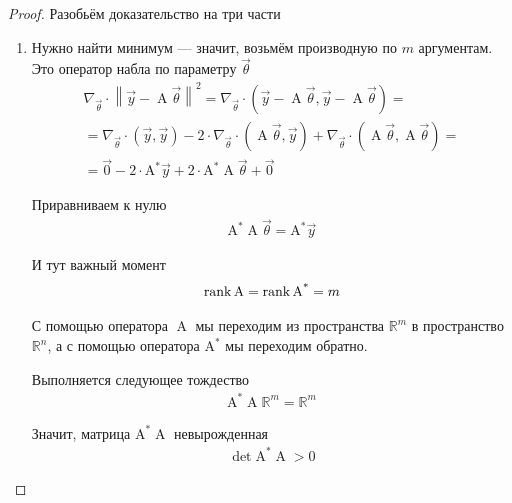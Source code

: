 \begin{proof}
  Разобьём доказательство на три части

  \begin{enumerate}
      \item Нужно найти минимум --- значит, возьмём производную по $m$
      аргументам. Это оператор набла по параметру $\vec{\theta}$
      \begin{align*}
          \nabla_{\vec{\theta}} \cdot \left\| \vec{y}
        - \operatorname{A} \vec{\theta} \right\|^2
          = \nabla_{\vec{\theta}} \cdot
        \left( \vec{y} - \operatorname{A} \vec{\theta},
        \vec{y} - \operatorname{A} \vec{\theta} \right) = \\
          = \nabla_{\vec{\theta}} \cdot \left( \vec{y}, \vec{y} \right)
        - 2 \cdot \nabla_{\vec{\theta}} \cdot
            \left( \operatorname{A} \vec{\theta}, \vec{y} \right)
        + \nabla_{\vec{\theta}} \cdot
            \left( \operatorname{A} \vec{\theta},
        \operatorname{A} \vec{\theta} \right) = \\
          = \vec{0} - 2 \cdot \operatorname{A^*} \vec{y}
        + 2 \cdot \operatorname{A^*} \operatorname{A} \vec{\theta}
        + \vec{0}
      \end{align*}

      Приравниваем к нулю
      \begin{align*}
          \operatorname{A^*} \operatorname{A} \vec{\theta}
          = \operatorname{A^*} \vec{y}
      \end{align*}

      И тут важный момент
      \begin{align*}
          \operatorname{rank}{\operatorname{A}} = \operatorname{rank}{\operatorname{A^*}} = m
      \end{align*}

      С помощью оператора $\operatorname{A}$ мы переходим из пространства
      $\mathbb{R}^m$ в пространство $\mathbb{R}^n$, а с помощью оператора
      $\operatorname{A^*}$ мы переходим обратно.

      Выполняется следующее тождество
      \begin{align*}
          \operatorname{A^*} \operatorname{A} \mathbb{R}^m = \mathbb{R}^m
      \end{align*}

      Значит, матрица $\operatorname{A^*} \operatorname{A}$ невырожденная
      \begin{align*}
          \det{\operatorname{A^*} \operatorname{A}} > 0
      \end{align*}


\end{enumerate}
\end{proof}
